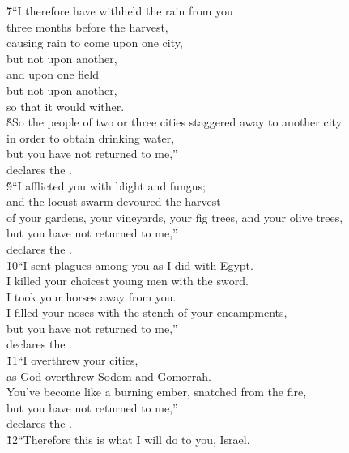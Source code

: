 \begin{poetry}
\poeml \v{7}``I therefore have withheld the rain from you \\
\poemll    three months before the harvest, \\
\poeml causing rain to come upon one city, \\
\poemll    but not upon another, \\
\poeml and upon one field \\
\poemll    but not upon another, \\
\poemlll       so that it would wither. \\
\poeml \v{8}So the people of two or three cities staggered away to another city \\
\poemll    in order to obtain drinking water, \\
\poeml but you have not returned to me,'' \\
\poemll    declares the . \\
\poeml \v{9}``I afflicted you with blight and fungus; \\
\poemll    and the locust swarm devoured the harvest \\
\poemlll       of your gardens, your vineyards, your fig trees, and your olive trees, \\
\poemll    but you have not returned to me,'' \\
\poemlll       declares the . \\
\poeml \v{10}``I sent plagues among you as I did with Egypt. \\
\poemll    I killed your choicest young men with the sword. \\
\poeml I took your horses away from you. \\
\poemll    I filled your noses with the stench of your encampments, \\
\poeml but you have not returned to me,'' \\
\poemll    declares the . \\
\poeml \v{11}``I overthrew your cities, \\
\poemll    as God overthrew Sodom and Gomorrah. \\
\poeml You've become like a burning ember, snatched from the fire, \\
\poemll    but you have not returned to me,'' \\
\poemlll       declares the . \\
\poeml \v{12}``Therefore this is what I will do to you, Israel. \\

\end{poetry}
